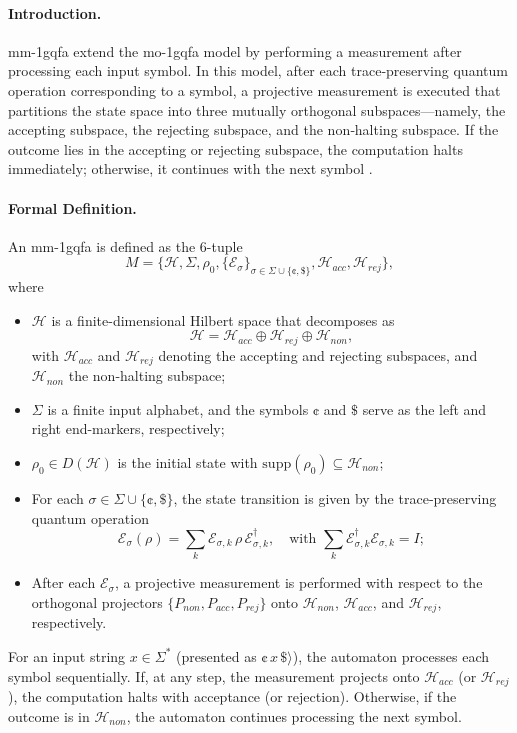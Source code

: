 \paragraph{Introduction.}  
\gls{mm-1gqfa} extend the \gls{mo-1gqfa} model by performing a measurement after processing each input symbol. In this model, after each trace‐preserving quantum operation corresponding to a symbol, a projective measurement is executed that partitions the state space into three mutually orthogonal subspaces—namely, the accepting subspace, the rejecting subspace, and the non‐halting subspace. If the outcome lies in the accepting or rejecting subspace, the computation halts immediately; otherwise, it continues with the next symbol \cite{LI201273}.

\paragraph{Formal Definition.}  
An \gls{mm-1gqfa} is defined as the 6-tuple
\[
M = \{ \mathcal{H},\Sigma,\rho_0,\{\mathcal{E}_\sigma\}_{\sigma\in\Sigma\cup\{\cent,\$\}},\mathcal{H}_{acc},\mathcal{H}_{rej}\},
\]
where
\begin{itemize}
  \item $\mathcal{H}$ is a finite-dimensional Hilbert space that decomposes as
  \[
  \mathcal{H}=\mathcal{H}_{acc}\oplus \mathcal{H}_{rej}\oplus \mathcal{H}_{non},
  \]
  with $\mathcal{H}_{acc}$ and $\mathcal{H}_{rej}$ denoting the accepting and rejecting subspaces, and $\mathcal{H}_{non}$ the non-halting subspace;
  \item $\Sigma$ is a finite input alphabet, and the symbols $\cent$ and $\$$ serve as the left and right end-markers, respectively;
  \item $\rho_0\in D(\mathcal{H})$ is the initial state with $\mathrm{supp}(\rho_0)\subseteq \mathcal{H}_{non}$;
  \item For each $\sigma\in\Sigma\cup\{\cent,\$\}$, the state transition is given by the trace‐preserving quantum operation 
  \[
  \mathcal{E}_\sigma(\rho)=\sum_{k} \mathcal{E}_{\sigma,k}\,\rho\,\mathcal{E}_{\sigma,k}^\dagger,\quad \text{with } \sum_{k} \mathcal{E}_{\sigma,k}^\dagger \mathcal{E}_{\sigma,k}=I;
  \]
  \item After each $\mathcal{E}_\sigma$, a projective measurement is performed with respect to the orthogonal projectors $\{P_{non},P_{acc},P_{rej}\}$ onto $\mathcal{H}_{non}$, $\mathcal{H}_{acc}$, and $\mathcal{H}_{rej}$, respectively.
\end{itemize}
For an input string $x\in\Sigma^*$ (presented as $\cent\,x\,\$\rangle$), the automaton processes each symbol sequentially. If, at any step, the measurement projects onto $\mathcal{H}_{acc}$ (or $\mathcal{H}_{rej}$), the computation halts with acceptance (or rejection). Otherwise, if the outcome is in $\mathcal{H}_{non}$, the automaton continues processing the next symbol.

